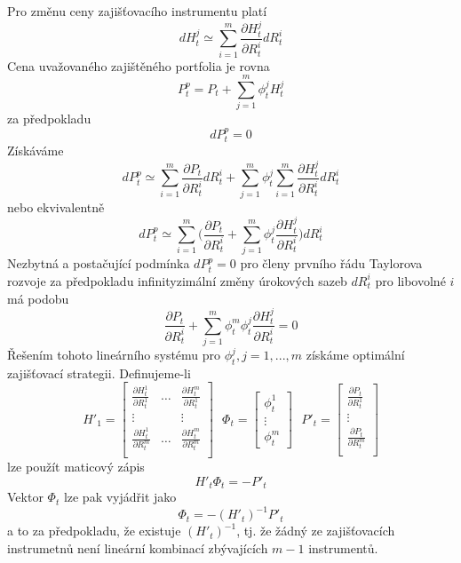 \documentclass[a4paper]{book}
\begin{document}
Pro změnu ceny zajišťovacího instrumentu platí
\begin{equation*}
dH_t^j \simeq \sum_{i=1}^m \frac{\partial H_t^j}{\partial R_t^i}dR_t^i
\end{equation*}
Cena uvažovaného zajištěného portfolia je rovna
\begin{equation*}
P_t^p = P_t + \sum_{j=1}^m \phi_t^j H_t^j
\end{equation*}
za předpokladu
\begin{equation*}
dP_t^p = 0
\end{equation*}
Získáváme
\begin{equation*}
dP_t^p \simeq \sum_{i=1}^m \frac{\partial P_t}{\partial R_t^i}dR_t^i + \sum_{j=1}^m \phi_t^j \sum_{i=1}^m \frac{\partial H_t^j}{\partial R_t^i}dR_t^i
\end{equation*}
nebo ekvivalentně
\begin{equation*}
dP_t^p \simeq \sum_{i=1}^m \Bigg( \frac{\partial P_t}{\partial R_t^i} + \sum_{j=1}^m \phi_t^j \frac{\partial H_t^j}{\partial R_t^i} \Bigg)dR_t^i
\end{equation*}
Nezbytná a postačující podmínka $dP_t^p = 0$ pro členy prvního řádu Taylorova rozvoje za předpokladu infinityzimální změny úrokových sazeb $dR_t^i$ pro libovolné $i$ má podobu
\begin{equation*}
\frac{\partial P_t}{\partial R_t^i} + \sum_{j=1}^m \phi_t^m \phi_t^j \frac{\partial H_t^j}{\partial R_t^i} = 0
\end{equation*}
Řešením tohoto lineárního systému pro $\phi_t^j, j = 1,...,m$ získáme optimální zajišťovací strategii. Definujeme-li
\begin{equation*}
H'_1 = 
\begin{bmatrix}
\frac{\partial H_t^1}{\partial R_t^1} & \dots & \frac{\partial H_t^m}{\partial R_t^1} \\
\vdots & & \vdots \\
\frac{\partial H_t^1}{\partial R_t^m} & \dots & \frac{\partial H_t^m}{\partial R_t^m} \\
\end{bmatrix}
~~~
\Phi_t = 
\begin{bmatrix}
\phi_t^1 \\
\vdots \\
\phi_t^m
\end{bmatrix}
~~~
P'_t =
\begin{bmatrix}
\frac{\partial P_t}{\partial R_t^1} \\
\vdots \\
\frac{\partial P_t}{\partial R_t^m} \\
\end{bmatrix}
\end{equation*}
lze použít maticový zápis
\begin{equation*}
H'_t \Phi_t = - P'_t
\end{equation*}
Vektor $\Phi_t$ lze pak vyjádřit jako
\begin{equation*}
\Phi_t = -(H'_t)^{-1}P'_t
\end{equation*}
a to za předpokladu, že existuje $(H'_t)^{-1}$, tj. že žádný ze zajišťovacích instrumetnů není lineární kombinací zbývajících $m-1$ instrumentů.
\end{document}
